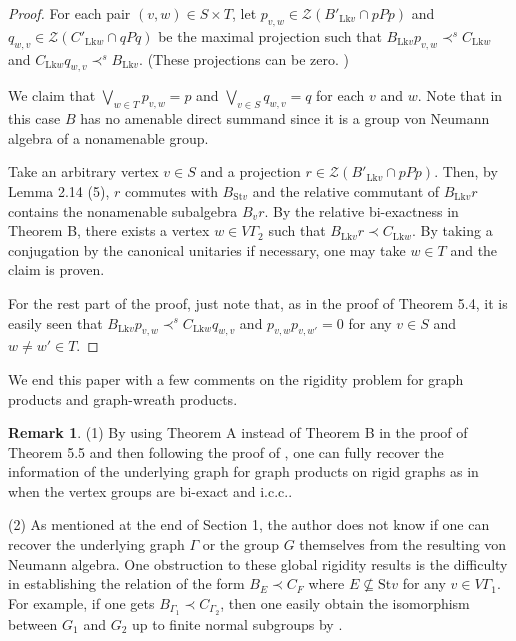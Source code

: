 \documentclass{amsart}
\theoremstyle{definition}
\newtheorem{remark}[theorem]{Remark}
\begin{document}
\begin{proof}
For each pair $(v,w)\in S\times T$, 
let $p_{v,w}\in \mathcal{Z}(B'_{\mathrm{Lk}v}\cap pPp)$ and $q_{w,v}\in \mathcal{Z}(C'_{\mathrm{Lk}w}\cap qPq)$ be the maximal projection 
such that $B_{\mathrm{Lk}v}p_{v,w}\prec^s C_{\mathrm{Lk}w}$ and 
$C_{\mathrm{Lk}w}q_{w,v}\prec^s B_{\mathrm{Lk}v}$. 
(These projections can be zero. )

We claim that $\bigvee_{w\in T} p_{v,w}=p$ and $\bigvee_{v\in S} q_{w,v}=q$
for each $v$ and $w$. 
Note that in this case $B$ has no amenable direct summand 
since it is a group von Neumann algebra
of a nonamenable group.

Take an arbitrary vertex $v\in S$ 
and a projection $r\in \mathcal{Z}(B'_{\mathrm{Lk}v}\cap pPp)$. 
Then, by Lemma 2.14 (5), $r$ commutes with $B_{\mathrm{St}v}$ and the relative commutant of $B_{\mathrm{Lk}v}r$ contains the nonamenable subalgebra $B_vr$. 
By the relative bi-exactness in Theorem B, 
there exists a vertex $w\in V\Gamma_2$ such that $B_{\mathrm{Lk}v}r\prec C_{\mathrm{Lk}w}$. 
By taking a conjugation by the canonical unitaries if necessary, one may take $w\in T$ 
and the claim is proven.  


For the rest part of the proof, 
just note that, as in the proof of Theorem 5.4, 
it is easily seen that 
$B_{\mathrm{Lk}v}p_{v,w}\prec^s C_{\mathrm{Lk}w}q_{w,v}$
and
$p_{v,w}p_{v,w'}= 0$ for any $v\in S$ and $w\neq w'\in T$. 
\end{proof}

We end this paper with a few comments on the rigidity problem for graph products and graph-wreath products. 

\begin{remark}
(1) By using Theorem A instead of Theorem B in the proof of Theorem 5.5 and then 
following the proof of \cite[Theorem 6.18]{bcc}, one can fully recover 
the information of the underlying graph for graph products on rigid graphs 
as in \cite[Theorem 6.18]{bcc} 
when the vertex groups are bi-exact and i.c.c.. 

(2) As mentioned at the end of Section 1, the author does not know if one can recover 
the underlying graph $\Gamma$ or the group $G$ themselves from the resulting von Neumann algebra. One obstruction to these global rigidity results is the difficulty in establishing the relation of the form $B_E \prec C_F$ where $E\nsubseteq \mathrm{St}v$ for any $v\in V\Gamma_1$. For example, if one gets $B_{\Gamma_1}\prec C_{\Gamma_2}$, then 
one easily obtain the isomorphism between $G_1$ and $G_2$ up to finite normal subgroups 
by \cite[Lemma 7.6]{im}. 

\end{remark}








\end{document}
